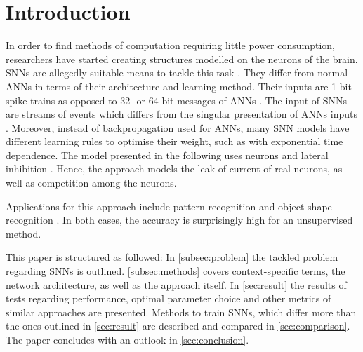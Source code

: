 \section{Introduction}

In order to find methods of computation requiring little power consumption, 
researchers have started creating structures modelled on the neurons of the brain.
\acp{SNN} are allegedly suitable means to tackle this task \cite{SNN}.
They differ from normal \acp{ANN} in terms of their architecture and learning method.
Their inputs are 1-bit spike trains as opposed to 32- or 64-bit messages of \acp{ANN} \cite{SNN}.
The input of \acp{SNN} are streams of events which differs from the singular presentation of \acp{ANN} inputs \cite{ANN_SNN_conversion}.
Moreover, instead of backpropagation used for \acp{ANN}, many \ac{SNN} models have different learning rules to optimise their weight, 
such as  with exponential time dependence.
The model presented in the following uses  neurons and lateral inhibition \cite{SNN}.
Hence, the approach models the leak of current of real neurons, as well as competition among the neurons.

Applications for this approach include pattern recognition \cite{SNN} and object shape recognition \cite{object_detection_SNN,multi_scale_STDP}.
In both cases, the accuracy is surprisingly high for an unsupervised method.

This paper is structured as followed:
In \autoref{subsec:problem} the tackled problem regarding \acp{SNN} is outlined.
\autoref{subsec:methods} covers context-specific terms, the network architecture,
 as well as the approach itself.
In \autoref{sec:result} the results of tests regarding performance, optimal parameter choice and other metrics of similar approaches are presented.
Methods to train \acp{SNN}, which differ more than the ones outlined in \autoref{sec:result} are described and compared in \autoref{sec:comparison}.
The paper concludes with an outlook in \autoref{sec:conclusion}.